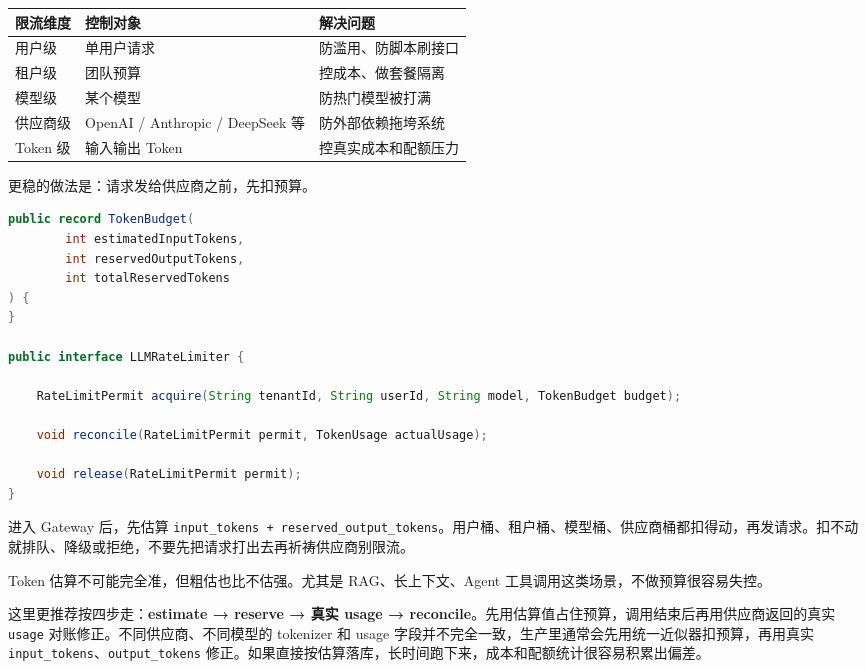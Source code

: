 \documentclass[9pt,a4paper,twocolumn]{ctexart}
\begin{document}
{\footnotesize
\begin{tabular}{|p{}|p{}|p{}|}
\hline
\textbf{限流维度} & \textbf{控制对象} & \textbf{解决问题} \\
\hline
用户级 & 单用户请求 & 防滥用、防脚本刷接口 \\
\hline
租户级 & 团队预算 & 控成本、做套餐隔离 \\
\hline
模型级 & 某个模型 & 防热门模型被打满 \\
\hline
供应商级 & OpenAI / Anthropic / DeepSeek 等 & 防外部依赖拖垮系统 \\
\hline
Token 级 & 输入输出 Token & 控真实成本和配额压力 \\
\hline
\end{tabular}
}



更稳的做法是：请求发给供应商之前，先扣预算。



\begin{lstlisting}[language=Java]
public record TokenBudget(
        int estimatedInputTokens,
        int reservedOutputTokens,
        int totalReservedTokens
) {
}

public interface LLMRateLimiter {

    RateLimitPermit acquire(String tenantId, String userId, String model, TokenBudget budget);

    void reconcile(RateLimitPermit permit, TokenUsage actualUsage);

    void release(RateLimitPermit permit);
}
\end{lstlisting}



进入 Gateway 后，先估算 \texttt{input\_tokens + reserved\_output\_tokens}。用户桶、租户桶、模型桶、供应商桶都扣得动，再发请求。扣不动就排队、降级或拒绝，不要先把请求打出去再祈祷供应商别限流。



Token 估算不可能完全准，但粗估也比不估强。尤其是 RAG、长上下文、Agent 工具调用这类场景，不做预算很容易失控。



这里更推荐按四步走：\textbf{estimate → reserve → 真实 usage → reconcile}。先用估算值占住预算，调用结束后再用供应商返回的真实 \texttt{usage} 对账修正。不同供应商、不同模型的 tokenizer 和 usage 字段并不完全一致，生产里通常会先用统一近似器扣预算，再用真实 \texttt{input\_tokens}、\texttt{output\_tokens} 修正。如果直接按估算落库，长时间跑下来，成本和配额统计很容易积累出偏差。
\end{document}
